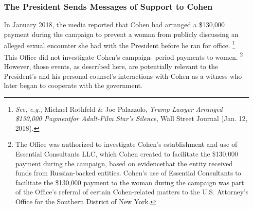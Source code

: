 \subsubsection{The President Sends Messages of Support to Cohen}

In January 2018, the media reported that Cohen had arranged a \$130,000 payment during the campaign to prevent a woman from publicly discussing an alleged sexual encounter she had with the President before he ran for office.%
\footnote{\textit{See, e.g.}, Michael Rothfeld \& Joe Palazzolo, \textit{Trump Lawyer Arranged \$130,000 Paymentfor Adult-Film Star’s Silence}, Wall Street Journal (Jan. 12, 2018).}
This Office did not investigate Cohen's campaign- period payments to women.%
\footnote{The Office was authorized to investigate Cohen’s establishment and use of Essential Consultants LLC, which Cohen created to facilitate the \$130,000 payment during the campaign, based on evidencethat the entity received funds from Russian-backed entities.
Cohen’s use of Essential Consultants to facilitate the \$130,000 payment to the woman during the campaign was part of the Office’s referral of certain Cohen-related matters to the U.S. Attorney’s Office for the Southern District of New York.}
However, those events, as described here, are potentially relevant to the President's and his personal counsel's interactions with Cohen as a witness who later began to cooperate with the government.


